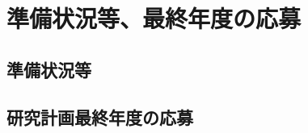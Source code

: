 \documentclass[11pt,a4paper,twoside]{jarticle}
\newcommand{\研究種別}{A}	%
\newcommand{\研究課題名}{Co-Creativeなソフトウェア開発手法向けPBL教材}
\newcommand{\研究機関名}{産業技術大学院大学}
\newcommand{\研究代表者氏名}{中鉢　欣秀}
\newcommand{\研究代表者氏名ふりがな}{ちゅうばち　よしひで}
\newcommand{\本応募effort}{\KLEffort{18}}	%
\newcommand{\研究期間の最終元号年度}{27}	%
\begin{document}
\section{準備状況等、最終年度の応募}
\subsection{準備状況等}
\newcommand{\準備状況等}{%
	象の卵について、文献調査を行っている。
	Dr.~Seussは"Horton Hatches the Egg"という論文を1940年に発表している。
	また最近では2004年に、南カルフォニア大のSam Yousefianの率いる研究チームが "The Elephant's Egg"という記録映画を発表している。\\
	({\tt http://www.bangbang.tv/syelephant.html})

	我々はさらに一歩進め、研究の経過を紹介する「threeD」の
	ドキュメンタリー映画を作って全国でロードショーを行う。
}

\subsection{研究計画最終年度の応募}
\newcommand{\研究計画最終年度の応募の研究種目名}{%
         基盤研究A
}

\newcommand{\研究計画最終年度の応募の審査区分}{%
	123
}

\newcommand{\研究計画最終年度の応募の課題番号}{%
12345678	%
}

\newcommand{\研究計画最終年度の応募の研究課題名}{%
	シロナガスクジラの卵の殻はなぜ見つからないのか
}

\newcommand{\研究計画最終年度の応募の研究期間初年度}{%
	15
}

\newcommand{\研究計画最終年度の応募の計画と成果}{%
	研究課題の通り、シロナガスクジラの卵は見つけられなかった。
}
\end{document}
